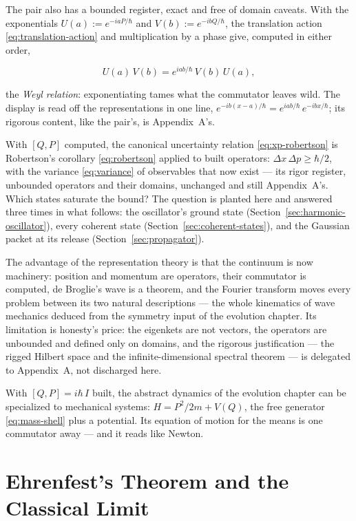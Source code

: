 The pair also has a bounded register, exact and free of domain caveats. With the exponentials $U(a) := e^{-iaP/\hbar}$ and $V(b) := e^{-ibQ/\hbar}$, the translation action \eqref{eq:translation-action} and multiplication by a phase give, computed in either order,
\begin{linenomath}
    \begin{equation}
        U(a)\,V(b) = e^{iab/\hbar}\,V(b)\,U(a),
        \label{eq:weyl-relations}
    \end{equation}
\end{linenomath}
the \emph{Weyl relation}: exponentiating tames what the commutator leaves wild. The display is read off the representations in one line, $e^{-ib(x-a)/\hbar} = e^{iab/\hbar}\,e^{-ibx/\hbar}$; its rigorous content, like the pair's, is Appendix~A's.

With $[Q, P]$ computed, the canonical uncertainty relation \eqref{eq:xp-robertson} is Robertson's corollary \eqref{eq:robertson} applied to built operators: $\Delta x\,\Delta p \geq \hbar/2$, with the variance \eqref{eq:variance} of observables that now exist --- its rigor register, unbounded operators and their domains, unchanged and still Appendix~A's. Which states saturate the bound? The question is planted here and answered three times in what follows: the oscillator's ground state (Section~\ref{sec:harmonic-oscillator}), every coherent state (Section~\ref{sec:coherent-states}), and the Gaussian packet at its release (Section~\ref{sec:propagator}).

The advantage of the representation theory is that the continuum is now machinery: position and momentum are operators, their commutator is computed, de Broglie's wave is a theorem, and the Fourier transform moves every problem between its two natural descriptions --- the whole kinematics of wave mechanics deduced from the symmetry input of the evolution chapter. Its limitation is honesty's price: the eigenkets are not vectors, the operators are unbounded and defined only on domains, and the rigorous justification --- the rigged Hilbert space and the infinite-dimensional spectral theorem --- is delegated to Appendix~A, not discharged here.

With $[Q, P] = i\hbar\,I$ built, the abstract dynamics of the evolution chapter can be specialized to mechanical systems: $H = P^2/2m + V(Q)$, the free generator \eqref{eq:mass-shell} plus a potential. Its equation of motion for the means is one commutator away --- and it reads like Newton.

\section{Ehrenfest's Theorem and the Classical Limit}
\label{sec:ehrenfest}

